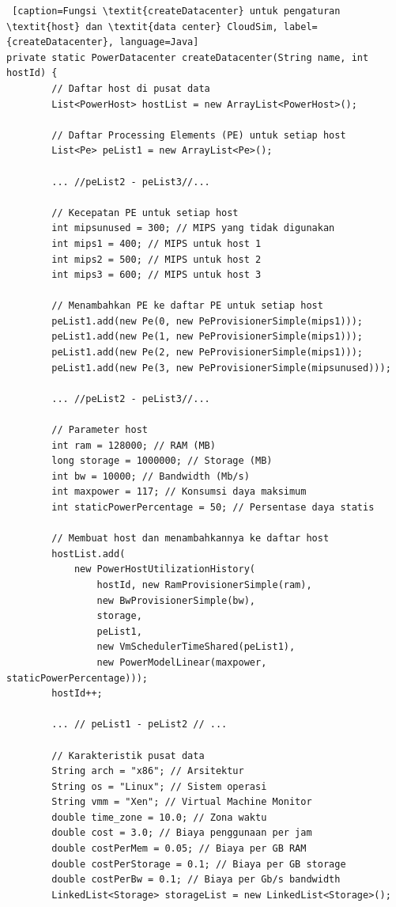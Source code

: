 \begin{lstlisting} [caption=Fungsi \textit{createDatacenter} untuk pengaturan \textit{host} dan \textit{data center} CloudSim, label={createDatacenter}, language=Java]
private static PowerDatacenter createDatacenter(String name, int hostId) {
        // Daftar host di pusat data
        List<PowerHost> hostList = new ArrayList<PowerHost>();

        // Daftar Processing Elements (PE) untuk setiap host
        List<Pe> peList1 = new ArrayList<Pe>();
        
        ... //peList2 - peList3//...

        // Kecepatan PE untuk setiap host
        int mipsunused = 300; // MIPS yang tidak digunakan
        int mips1 = 400; // MIPS untuk host 1
        int mips2 = 500; // MIPS untuk host 2
        int mips3 = 600; // MIPS untuk host 3

        // Menambahkan PE ke daftar PE untuk setiap host
        peList1.add(new Pe(0, new PeProvisionerSimple(mips1))); 
        peList1.add(new Pe(1, new PeProvisionerSimple(mips1)));
        peList1.add(new Pe(2, new PeProvisionerSimple(mips1)));
        peList1.add(new Pe(3, new PeProvisionerSimple(mipsunused)));
        
        ... //peList2 - peList3//...

        // Parameter host
        int ram = 128000; // RAM (MB)
        long storage = 1000000; // Storage (MB)
        int bw = 10000; // Bandwidth (Mb/s)
        int maxpower = 117; // Konsumsi daya maksimum
        int staticPowerPercentage = 50; // Persentase daya statis

        // Membuat host dan menambahkannya ke daftar host
        hostList.add(
            new PowerHostUtilizationHistory(
                hostId, new RamProvisionerSimple(ram),
                new BwProvisionerSimple(bw),
                storage,
                peList1,
                new VmSchedulerTimeShared(peList1),
                new PowerModelLinear(maxpower, staticPowerPercentage)));
        hostId++;
        
        ... // peList1 - peList2 // ...

        // Karakteristik pusat data
        String arch = "x86"; // Arsitektur
        String os = "Linux"; // Sistem operasi
        String vmm = "Xen"; // Virtual Machine Monitor
        double time_zone = 10.0; // Zona waktu
        double cost = 3.0; // Biaya penggunaan per jam
        double costPerMem = 0.05; // Biaya per GB RAM
        double costPerStorage = 0.1; // Biaya per GB storage
        double costPerBw = 0.1; // Biaya per Gb/s bandwidth
        LinkedList<Storage> storageList = new LinkedList<Storage>();


\end{lstlisting}
